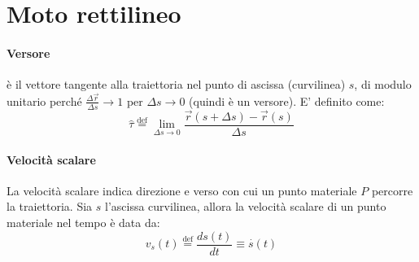 	\section{Moto rettilineo}

 \paragraph{Versore \hat \tau}
 \hat \tau è il vettore tangente alla traiettoria nel punto di ascissa (curvilinea) $s$, di modulo unitario 
 perché $\frac{\Delta \overset{\to}{r}}{\Delta s} \to 1$ per $\Delta s \to 0$ (quindi è un versore).
 E' definito come: \begin{equation} 
 \hat \tau \overset{\text {def}}{=}\lim _{\Delta s\to 0}\frac{\overset{\to}{r}(s+\Delta s)-\overset{\to}{r}(s)}{\Delta s}
 \end{equation}
 


 
	\paragraph{Velocità scalare} 
	La velocità scalare indica direzione e verso con cui un punto materiale $P$ percorre la traiettoria. 
 Sia $s$ l'ascissa curvilinea, allora la velocità scalare di un punto materiale nel tempo è data da: 
 \begin{equation}
		v_s(t)\overset{\text {def}}{=}\frac{ds(t)}{dt}\equiv \overset{\cdot}{s}(t)
	\end{equation}

 
